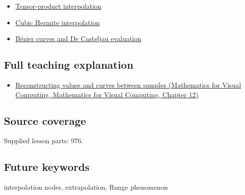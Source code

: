 \begin{itemize}
\tightlist
\item
  \hyperref[appendix-0a09b6dfdc86]{Tensor-product interpolation}
\item
  \hyperref[appendix-db3aef8f2fd6]{Cubic Hermite interpolation}
\item
  \hyperref[appendix-ddbec701898c]{Bézier curves and De Casteljau evaluation}
\end{itemize}

\subsection{Full teaching explanation}\label{appendix-0c2a5f69851e-full-teaching-explanation}

\begin{itemize}
\tightlist
\item
  \href{../02-Mathematics-for-Visual-Computing/main.pdf\#nameddest=02-foundations-ii-ch028-reconstructing-values-and-curves-between-samples}{Reconstructing values and curves between samples (Mathematics for Visual Computing, Mathematics for Visual Computing, Chapter 12)}
\end{itemize}

\subsection{Source coverage}\label{appendix-0c2a5f69851e-source-coverage}

Supplied lesson parts: 976.

\subsection{Future keywords}\label{appendix-0c2a5f69851e-future-keywords}

interpolation nodes, extrapolation, Runge phenomenon
